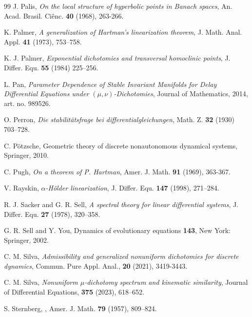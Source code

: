 \documentclass[reqno, a4paper, 10pt]{amsart}
\theoremstyle{plain}
\numberwithin{equation}{section}
\theoremstyle{remark}
\begin{document}
\begin{thebibliography}{99}
 J. Palis, \emph{On the local structure of hyperbolic points in Banach spaces}, An. Acad. Brasil. Ci\^enc. {\bf 40} (1968), 263-266.

K. Palmer, {\it A generalization of Hartman's linearization theorem}, J. Math. Anal. Appl. {\bf 41} (1973), 753--758.


 K. J. Palmer, \emph{Exponential dichotomies and transversal homoclinic points}, J. Differ. Equ. \textbf{55} (1984) 225--256.


L. Pan, \emph{Parameter Dependence of Stable Invariant Manifolds for Delay Differential
Equations under $(\mu,\nu)$-Dichotomies}, Journal of Mathematics, 2014, art. no. 989526.


 O. Perron, \emph{Die stabilit\"atsfrage bei differentialgleichungen}, Math. Z. \textbf{32} (1930) 703--728.

 C. P\"otzsche, Geometric theory of discrete nonautonomous dynamical systems, Springer, 2010.


C. Pugh, \emph{On a theorem of P. Hartman},  Amer. J. Math. {\bf 91} (1969), 363-367.

 V. Rayskin, {\it $\alpha$-H\"{o}lder linearization}, J. Differ. Equ. {\bf 147} (1998), 271--284.

 R. J. Sacker and G. R. Sell, \emph{A spectral theory for linear differential systems}, J. Differ. Equ. \textbf{27} (1978), 320--358.


    G. R. Sell and Y. You, Dynamics of evolutionary equations \textbf{143}, New York: Springer, 2002.



C. M. Silva, \emph{Admissibility and generalized nonuniform dichotomies for discrete dynamics}, Commun. Pure Appl. Anal., \textbf{20} (2021), 3419-3443.


C. M. Silva, \emph{Nonuniform $\mu$-dichotomy spectrum and kinematic similarity}, Journal of Differential Equations, \textbf{375} (2023), 618–652.



 S. Sternberg,
,
 \newblock Amer. J. Math. {\bf 79} (1957),
 809--824.
 

\end{thebibliography}
\end{document}
